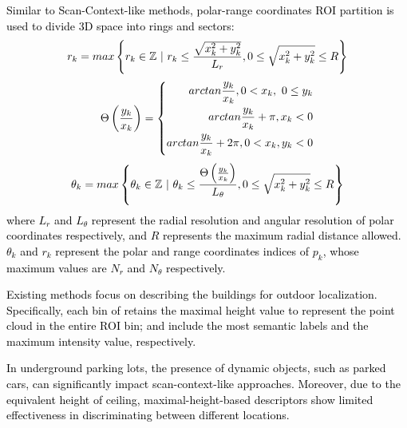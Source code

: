 \documentclass[letterpaper, 10 pt, conference]{ieeeconf}   %
\newcommand\kevin[1]{\textcolor{black}{#1}}
\begin{document}
\kevin{Similar to Scan-Context-like methods, polar-range coordinates ROI partition is used to divide 3D space into rings and sectors:}
\begin{equation}
\small
\label{rlayer}
    r_k=max\left\{r_k\in\mathbb{Z}\ |\ r_k\le\frac{\sqrt{x_k^2+y_k^2}}{L_r},0\le\sqrt{x_k^2+y_k^2}\le R\right\}
\end{equation}
\begin{equation}
\small
    \Theta\left(\frac{y_k}{x_k}\right)=\left\{
    \begin{aligned}
    arctan\frac{y_k}{x_k},{0<x}_k,\ 0\le y_k \\
    arctan\frac{y_k}{x_k}+\pi,x_k < 0 \\
    arctan\frac{y_k}{x_k}+2\pi,0<x_k,y_k<0
    \end{aligned}
    \right.
\end{equation}
\begin{equation}
\small
\label{thetalayer}
    \theta_k=max\left\{\theta_k\in\mathbb{Z}\ |\ \theta_k\le\frac{\Theta\left(\frac{y_k}{x_k}\right)}{L_\theta},0\le\sqrt{x_k^2+y_k^2}\le R\right\}
\end{equation}
\kevin{where $L_r$ and $L_\theta$ represent the radial resolution and angular resolution of polar coordinates respectively, and $R$ represents the maximum radial distance allowed. $\theta_k$ and $r_k$ represent the polar and range coordinates indices of $p_k$, whose maximum values are $N_r$ and $N_\theta$ respectively.}
 
\kevin{Existing methods focus on describing the buildings for outdoor localization. Specifically, each bin of \cite{kim2018scan} retains the maximal height value to represent the point cloud in the entire ROI bin; \cite{li2021ssc} and \cite{wang2020intensity} include the most semantic labels and the maximum intensity value, respectively. }

\kevin{In underground parking lots, the presence of dynamic objects, such as parked cars, can significantly impact scan-context-like approaches. Moreover, due to the equivalent height of ceiling,  maximal-height-based descriptors show limited effectiveness in discriminating between different locations. }

\end{document}
